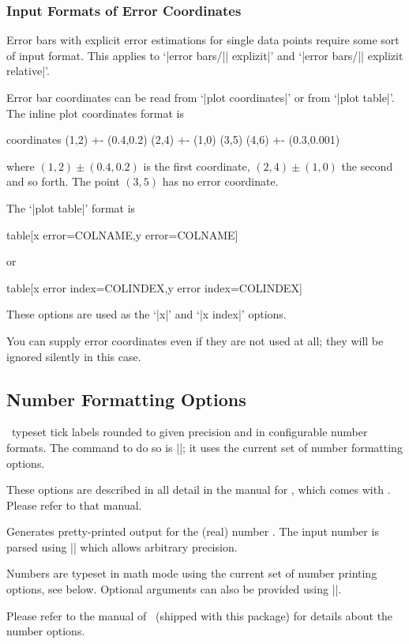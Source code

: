 {\subsubsection{Input Formats of Error Coordinates}
\label{sec:errorbar:input}%
Error bars with explicit error estimations for single data points require some sort of input format. This applies to `|error bars/|\meta{[xy]}| explizit|' and `|error bars/|\meta{[xy]}| explizit relative|'.

Error bar coordinates can be read from `|plot coordinates|' or from `|plot table|'. The inline plot coordinates format is
\begin{codeexample}
\addplot coordinates {
	(1,2) +- (0.4,0.2)
	(2,4) +- (1,0)
	(3,5)
	(4,6) +- (0.3,0.001)
}
\end{codeexample}
where $(1,2) \pm (0.4,0.2)$ is the first coordinate, $(2,4) \pm (1,0)$ the second and so forth. The point $(3,5)$ has no error coordinate.

The `|plot table|' format is
\begin{codeexample}
\addplot table[x error=COLNAME,y error=COLNAME]
\end{codeexample}
or
\begin{codeexample}
\addplot table[x error index=COLINDEX,y error index=COLINDEX]
\end{codeexample}
These options are used as the `|x|' and `|x index|' options.

You can supply error coordinates even if they are not used at all; they will be ignored silently in this case.

}%

\subsection{Number Formatting Options}
\label{sec:number:printing}%
\PGFPlots\ typeset tick labels rounded to given precision and in configurable number formats. The command to do so is |\pgfmathprintnumber|; it uses the current set of number formatting options.

These options are described in all detail in the manual for \PGFPlotstable, which comes with \PGFPlots. Please refer to that manual.

\begin{command}{\pgfmathprintnumber{}}
Generates pretty-printed output for the (real) number . The input number  is parsed using |\pgfmathfloatparsenumber| which allows arbitrary precision.

Numbers are typeset in math mode using the current set of number printing options, see below. Optional arguments can also be provided using ||.

Please refer to the manual of \PGFPlotstable\ (shipped with this package) for details about the number options.
\end{command}


